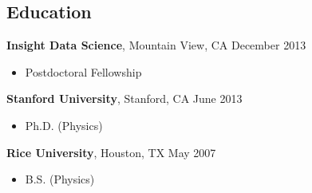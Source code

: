 \documentclass[margin,line]{resume}
\begin{document}
\begin{resume}
    \section{\mysidestyle Education}
    \textbf{Insight Data Science}, Mountain View, CA \hfill December 2013\vspace{-3mm}\\\vspace{-1mm}%
    \begin{itemize}
    \item Postdoctoral Fellowship
    \end{itemize}\vspace{-1.5mm}

    \textbf{Stanford University}, Stanford, CA \hfill June 2013\vspace{-3mm}\\\vspace{-1mm}%
    \begin{itemize}
    \item Ph.D. (Physics)
    \end{itemize}\vspace{-1.5mm}

    \textbf{Rice University}, Houston, TX \hfill May 2007\vspace{-3mm}\\\vspace{-1mm}%
    \begin{itemize}
    \item B.S. (Physics)
    \end{itemize}\vspace{-1.5mm}




\end{resume}
\end{document}
